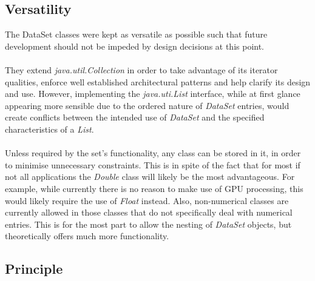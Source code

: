 \documentclass[main.tex]{subfiles}
\begin{document}
    \subsection{Versatility}
    
      The DataSet classes were kept as versatile as possible such that future development should not be impeded by design decisions at this point. 
      \\\\
      They extend \textit{java.util.Collection} in order to take advantage of its iterator qualities, enforce well established architectural patterns and help clarify its design and use. However, implementing the \textit{java.uti.List} interface, while at first glance appearing more sensible due to the ordered nature of \textit{DataSet} entries, would create conflicts between the intended use of  \textit{DataSet} and the specified characteristics of a \textit{List}.
      \\\\
      Unless required by the set's functionality, any class can be stored in it, in order to minimise unnecessary constraints. This is in spite of the fact that for most if not all applications the \textit{Double} class will likely be the most advantageous. For example, while currently there is no reason to make use of GPU processing, this would likely require the use of \textit{Float} instead. Also, non-numerical classes are currently allowed in those classes that do not specifically deal with numerical entries. This is for the most part to allow the nesting of \textit{DataSet} objects, but theoretically offers much more functionality.
    
    \subsection{Principle}
      \label{sec:impl:dataPrinciple}
      
\end{document}
